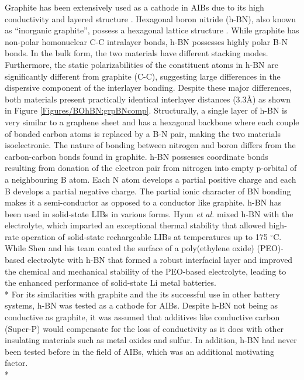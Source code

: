 Graphite has been extensively used as a cathode in AIBs due to its high conductivity and layered structure \cite{lin_ultrafast_2015,rani_fluorinated_2013,wang_advanced_2017,kravchyk_efficient_2017,li_novel_2018}. Hexagonal boron nitride (h-BN), also known as \enquote{inorganic graphite}, possess a hexagonal lattice structure \cite{hod_graphite_2012}. While graphite has non-polar homonuclear C-C intralayer bonds, h-BN possesses highly polar B-N bonds. In the bulk form, the two materials have different stacking modes. Furthermore, the static polarizabilities of the constituent atoms in h-BN are significantly different from graphite (C-C), suggesting large differences in the dispersive component of the interlayer bonding\cite{song_large_2010, zeng_white_2010}. Despite these major differences, both materials present practically identical interlayer distances (3.3\AA) as shown in  Figure \ref{Figures/BOhBN:grpBNcomp}. Structurally, a single layer of h-BN is very similar to a graphene sheet and has a hexagonal backbone where each couple of bonded carbon atoms is replaced by a B-N pair, making the two materials isoelectronic. The nature of bonding between nitrogen and boron differs from the carbon-carbon bonds found in graphite. h-BN possesses coordinate bonds resulting from donation of the electron pair from nitrogen into empty p-orbital of a neighbouring B atom. Each N atom develops a partial positive charge and each B develops a partial negative charge. The partial ionic character of BN bonding makes it a semi-conductor as opposed to a conductor like graphite. h-BN has been used in solid-state LIBs in various forms. Hyun \textit{et al.} mixed h-BN with the electrolyte, which imparted an exceptional thermal stability that allowed high-rate operation of solid-state rechargeable LIBs at temperatures up to 175 $^{\circ}$C\cite{hyun_high-modulus_2019}. While Shen and his team coated the surface of a poly(ethylene oxide) (PEO)-based electrolyte with h-BN that formed a robust interfacial layer and improved the chemical and mechanical stability of the PEO-based electrolyte, leading to the enhanced performance of solid-state Li metal batteries\cite{shen_chemically_2019}. \\*
For its similarities with graphite and the its successful use in other battery systems, h-BN was tested as a cathode for AIBs. Despite h-BN not being as conductive as graphite, it was assumed that additives like conductive carbon (Super-P) would compensate for the loss of conductivity as it does with other insulating materials such as metal oxides and sulfur. In addition, h-BN had never been tested before in the field of AIBs, which was an additional motivating factor.\\* 

